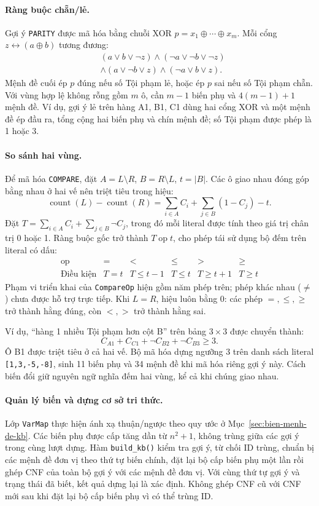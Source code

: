 \paragraph{Ràng buộc chẵn/lẻ.}
Gợi ý \texttt{PARITY} được mã hóa bằng chuỗi XOR $p=x_1\oplus\cdots\oplus x_m$. Mỗi cổng $z\leftrightarrow(a\oplus b)$ tương đương:
\[
\begin{aligned}
&(a\lor b\lor\neg z)\land(\neg a\lor\neg b\lor\neg z)\\
&\land(a\lor\neg b\lor z)\land(\neg a\lor b\lor z).
\end{aligned}
\]
Mệnh đề cuối ép $p$ đúng nếu số Tội phạm lẻ, hoặc ép $p$ sai nếu số Tội phạm chẵn. Với vùng hợp lệ không rỗng gồm $m$ ô, cần $m-1$ biến phụ và $4(m-1)+1$ mệnh đề. Ví dụ, gợi ý lẻ trên hàng A1, B1, C1 dùng hai cổng XOR và một mệnh đề ép đầu ra, tổng cộng hai biến phụ và chín mệnh đề; số Tội phạm được phép là 1 hoặc 3.

\paragraph{So sánh hai vùng.}
Để mã hóa \texttt{COMPARE}, đặt $A=L\setminus R$, $B=R\setminus L$, $t=|B|$. Các ô giao nhau đóng góp bằng nhau ở hai vế nên triệt tiêu trong hiệu:
\[
\operatorname{count}(L)-\operatorname{count}(R)
=\sum_{i\in A}C_i+\sum_{j\in B}(1-C_j)-t.
\]
Đặt $T=\sum_{i\in A}C_i+\sum_{j\in B}\neg C_j$, trong đó mỗi literal được tính theo giá trị chân trị 0 hoặc 1. Ràng buộc gốc trở thành $T\operatorname{op}t$, cho phép tái sử dụng bộ đếm trên literal có dấu:
\[
\begin{array}{c|ccccc}
\operatorname{op} & = & < & \le & > & \ge\\ \hline
\text{Điều kiện} & T=t & T\le t-1 & T\le t & T\ge t+1 & T\ge t
\end{array}
\]
Phạm vi triển khai của \texttt{CompareOp} hiện gồm năm phép trên; phép khác nhau ($\ne$) chưa được hỗ trợ trực tiếp. Khi $L=R$, hiệu luôn bằng 0: các phép $=,\le,\ge$ trở thành hằng đúng, còn $<,>$ trở thành hằng sai.

Ví dụ, ``hàng 1 nhiều Tội phạm hơn cột B'' trên bảng $3\times3$ được chuyển thành:
\[
C_{A1}+C_{C1}+\neg C_{B2}+\neg C_{B3}\ge3.
\]
Ô B1 được triệt tiêu ở cả hai vế. Bộ mã hóa dựng ngưỡng 3 trên danh sách literal \texttt{[1,3,-5,-8]}, sinh 11 biến phụ và 34 mệnh đề khi mã hóa riêng gợi ý này. Cách biến đổi giữ nguyên ngữ nghĩa đếm hai vùng, kể cả khi chúng giao nhau.

\paragraph{Quản lý biến và dựng cơ sở tri thức.}
Lớp \texttt{VarMap} thực hiện ánh xạ thuận/ngược theo quy ước ở Mục~\ref{sec:bien-menh-de-kb}. Các biến phụ được cấp tăng dần từ $n^2+1$, không trùng giữa các gợi ý trong cùng lượt dựng. Hàm \texttt{build\_kb()} kiểm tra gợi ý, từ chối ID trùng, chuẩn bị các mệnh đề đơn vị theo thứ tự biến chính, đặt lại bộ cấp biến phụ một lần rồi ghép CNF của toàn bộ gợi ý với các mệnh đề đơn vị. Với cùng thứ tự gợi ý và trạng thái đã biết, kết quả dựng lại là xác định. Không ghép CNF cũ với CNF mới sau khi đặt lại bộ cấp biến phụ vì có thể trùng ID.


